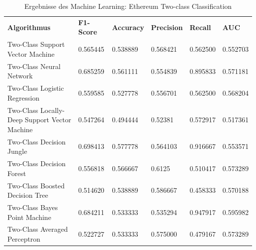 \begin{table}[H]
\centering
\begin{tabular}{|p{5cm}|p{}|p{}|p{}|p{}|p{}|}
\hline
\textbf{Algorithmus} & \textbf{F1-Score} & \textbf{Accuracy} & \textbf{Precision} & \textbf{Recall} & \textbf{AUC}\\ 
\hhline{======}
Two-Class Support Vector Machine & 0.565445 & 0.538889 & 0.568421 & 0.562500 & 0.552703 \\ \hline
Two-Class Neural Network & 0.685259 & 0.561111 & 0.554839 & 0.895833 & 0.571181 \\ \hline
Two-Class Logistic Regression & 0.559585 & 0.527778 & 0.556701 & 0.562500 & 0.568204 \\ \hline
Two-Class Locally-Deep Support Vector Machine & 0.547264 & 0.494444 & 0.52381 & 0.572917 & 0.517361 \\ \hline
Two-Class Decision Jungle & 0.698413 & 0.577778 & 0.564103 & 0.916667 & 0.553571 \\ \hline
Two-Class Decision Forest & 0.556818 & 0.566667 & 0.6125 & 0.510417 & 0.573289 \\ \hline
Two-Class Boosted Decision Tree & 0.514620 & 0.538889 & 0.586667 & 0.458333 & 0.570188 \\ \hline
Two-Class Bayes Point Machine & 0.684211 & 0.533333 & 0.535294 & 0.947917 & 0.595982 \\ \hline
Two-Class Averaged Perceptron & 0.522727 & 0.533333 & 0.575000 & 0.479167 & 0.573289 \\ \hline
\end{tabular}
\caption{Ergebnisse des Machine Learning: Ethereum Two-class Classification}
\label{tab:ETH2}
\end{table}

